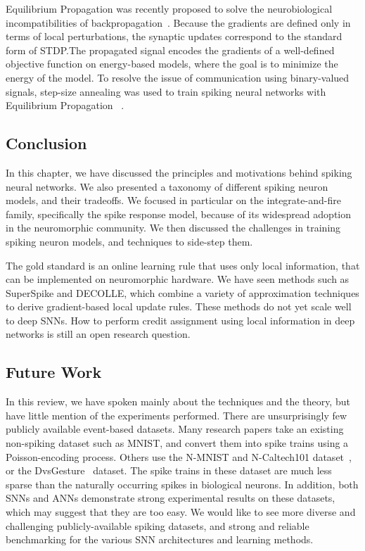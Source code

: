 \documentclass[fyp]{socreport}
\begin{document}
Equilibrium Propagation was recently proposed to solve the neurobiological
incompatibilities of backpropagation~\cite{10.3389/fncom.2017.00024}. Because
the gradients are defined only in terms of local perturbations, the synaptic
updates correspond to the standard form of STDP.\@ The propagated signal encodes
the gradients of a well-defined objective function on energy-based models, where
the goal is to minimize the energy of the model. To resolve the issue of
communication using binary-valued signals, step-size annealing was used to train
spiking neural networks with Equilibrium Propagation
~\cite{pmlr-v89-o-connor19a}.

\subsection{Conclusion\label{sec:background_conclusion}}

In this chapter, we have discussed the principles and motivations behind spiking
neural networks. We also presented a taxonomy of different spiking neuron
models, and their tradeoffs. We focused in particular on the integrate-and-fire
family, specifically the spike response model, because of its widespread
adoption in the neuromorphic community. We then discussed the challenges in
training spiking neuron models, and techniques to side-step them.

The gold standard is an online learning rule that uses only local information,
that can be implemented on neuromorphic hardware. We have seen methods such as
SuperSpike and DECOLLE, which combine a variety of approximation techniques to
derive gradient-based local update rules. These methods do not yet scale well to
deep SNNs. How to perform credit assignment using local information in deep
networks is still an open research question.

\subsection{Future Work}

In this review, we have spoken mainly about the techniques and the theory, but
have little mention of the experiments performed. There are unsurprisingly few
publicly available event-based datasets. Many research papers take an existing
non-spiking dataset such as MNIST, and convert them into spike trains using a
Poisson-encoding process. Others use the N-MNIST and N-Caltech101
dataset~\cite{orchard15_conver_static_image_datas_to}, or the
DvsGesture~\cite{dvsgesture} dataset. The spike trains in these dataset are much
less sparse than the naturally occurring spikes in biological neurons. In
addition, both SNNs and ANNs demonstrate strong experimental results on these
datasets, which may suggest that they are too easy. We would like to see more
diverse and challenging publicly-available spiking datasets, and strong and
reliable benchmarking for the various SNN architectures and learning methods.
\end{document}
